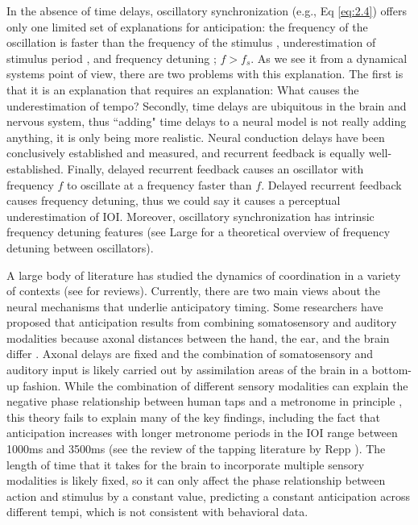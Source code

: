 \documentclass{report}
\begin{document}
In the absence of time delays, oscillatory synchronization (e.g., Eq \eqref{eq:2.4}) offers only one limited set of explanations for anticipation: the frequency of the oscillation is faster than the frequency of the stimulus \cite{kim2015signal}, underestimation of stimulus period \cite{flach2005transition}, and frequency detuning \cite{kelso1990action}; $f > f_s$. As we see it from a dynamical systems point of view, there are two problems with this explanation. The first is that it is an explanation that requires an explanation: What causes the underestimation of tempo? Secondly, time delays are ubiquitous in the brain and nervous system, thus ``adding" time delays to a neural model is not really adding anything, it is only being more realistic. Neural conduction delays have been conclusively established and measured, and recurrent feedback is equally well-established. Finally, delayed recurrent feedback causes an oscillator with frequency $f$ to oscillate at a frequency faster than $f$. Delayed recurrent feedback causes frequency detuning, thus we could say it causes a perceptual underestimation of IOI. Moreover, oscillatory synchronization has intrinsic frequency detuning features (see Large \cite{large2008resonating} for a theoretical overview of frequency detuning between oscillators).

A large body of literature has studied the dynamics of coordination in a variety of contexts (see \cite{repp2005sensorimotor, repp2013sensorimotor} for reviews). Currently, there are two main views about the neural mechanisms that underlie anticipatory timing. Some researchers have proposed that anticipation results from combining somatosensory and auditory modalities because axonal distances between the hand, the ear, and the brain differ \cite{aschersleben1995synchronizing, prinz1992don}. Axonal delays are fixed and the combination of somatosensory and auditory input is likely carried out by assimilation areas of the brain in a bottom-up fashion. While the combination of different sensory modalities can explain the negative phase relationship between human taps and a metronome in principle \cite{aschersleben2002temporal, bialunska2011increasing}, this theory fails to explain many of the key findings, including the fact that anticipation increases with longer metronome periods in the IOI range between 1000ms and 3500ms (see the review of the tapping literature by Repp \cite{repp2005sensorimotor}). The length of time that it takes for the brain to incorporate multiple sensory modalities is likely fixed, so it can only affect the phase relationship between action and stimulus by a constant value, predicting a constant anticipation across different tempi, which is not consistent with behavioral data.
\end{document}

